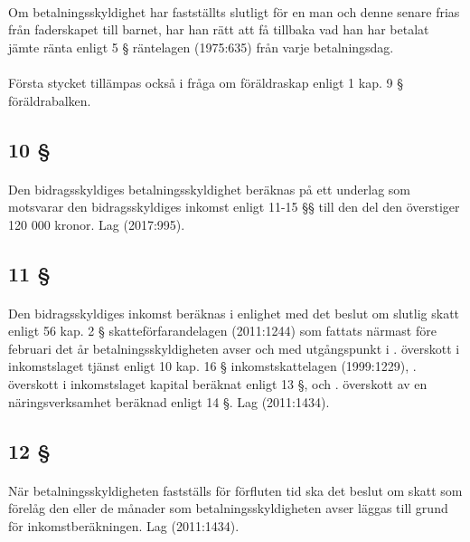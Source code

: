\documentclass[a4paper,notitlepage,openany,10pt]{book}
\begin{document}
\paragraph*{}
Om betalningsskyldighet har fastställts slutligt för en man och denne senare frias från faderskapet till barnet, har han rätt att få tillbaka vad han har betalat jämte ränta enligt 5 § räntelagen (1975:635) från varje betalningsdag.
\paragraph*{}
Första stycket tillämpas också i fråga om föräldraskap enligt 1 kap. 9 § föräldrabalken.
\subsection*{10 §}
\paragraph*{}
Den bidragsskyldiges betalningsskyldighet beräknas på ett underlag som motsvarar den bidragsskyldiges inkomst enligt 11-15 §§ till den del den överstiger 120 000 kronor.
Lag (2017:995).
\subsection*{11 §}
\paragraph*{}
Den bidragsskyldiges inkomst beräknas i enlighet med det beslut om slutlig skatt enligt 56 kap. 2 § skatteförfarandelagen (2011:1244) som fattats närmast före februari det år betalningsskyldigheten avser och med utgångspunkt i
. överskott i inkomstslaget tjänst enligt 10 kap. 16 § inkomstskattelagen (1999:1229),
. överskott i inkomstslaget kapital beräknat enligt 13 §, och
. överskott av en näringsverksamhet beräknad enligt 14 §.
Lag (2011:1434).
\subsection*{12 §}
\paragraph*{}
När betalningsskyldigheten fastställs för förfluten tid ska det beslut om skatt som förelåg den eller de månader som betalningsskyldigheten avser läggas till grund för inkomstberäkningen.
Lag (2011:1434).
\end{document}
